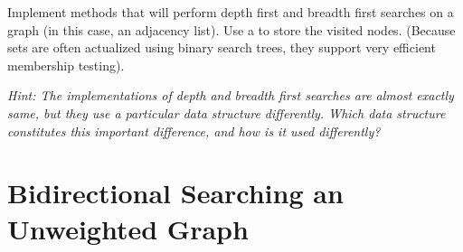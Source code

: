 \begin{problem}
Implement methods that will perform depth first and breadth first searches on a graph (in this case, an adjacency list).
Use a  to store the visited nodes. (Because sets are often actualized using binary search trees, they support very efficient membership testing).

\textit{Hint: The implementations of depth and breadth first searches are almost exactly same, but they use a particular data structure differently. Which data structure constitutes this important difference, and how is it used differently?}
\end{problem}

\section*{Bidirectional Searching an Unweighted Graph}

